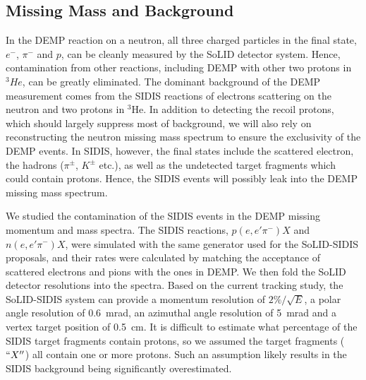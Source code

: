 \subsection{Missing Mass and Background}

In the DEMP reaction on a neutron, all three charged particles in the final
state, $e^{-}$, $\pi^{-}$ and $p$, can be cleanly measured by the SoLID detector
system.  Hence, contamination from other reactions, including
DEMP with other two protons in $^{3}He$, can be greatly eliminated.  The
dominant background of the DEMP measurement comes from the SIDIS reactions of
electrons scattering on the neutron and two protons in $\mathrm{^{3}He}$. In
addition to detecting the recoil protons, which should largely suppress most of
background, we will also rely on reconstructing the neutron missing mass
spectrum to ensure the exclusivity of the DEMP events. In SIDIS, however, the
final states include the scattered electron, the hadrons ($\pi^{\pm}$,
$K^{\pm}$ etc.), as well as the undetected target fragments which could contain
protons. Hence, the SIDIS events will possibly leak into the DEMP missing mass
spectrum.

We studied the contamination of the SIDIS events in the DEMP missing momentum
and mass spectra. The SIDIS reactions, $p(e,e'\pi^{-})X$ and $n(e,e'\pi^{-})X$,
were simulated with the same generator used for the SoLID-SIDIS proposals, and
their rates were calculated by matching the acceptance of scattered electrons
and pions with the ones in DEMP. We then fold the SoLID detector resolutions
into the spectra. Based on the current tracking study, the SoLID-SIDIS system
can provide a momentum resolution of $2\%/\sqrt{E}$, a polar angle
resolution of 0.6~mrad, an azimuthal angle resolution of 5~mrad and a
vertex target position of 0.5~cm. It is difficult to estimate what
percentage of the SIDIS target fragments contain protons, so we assumed
the target fragments ($``X''$) all contain one or more protons. Such an
assumption likely results in the SIDIS background being significantly
overestimated.

